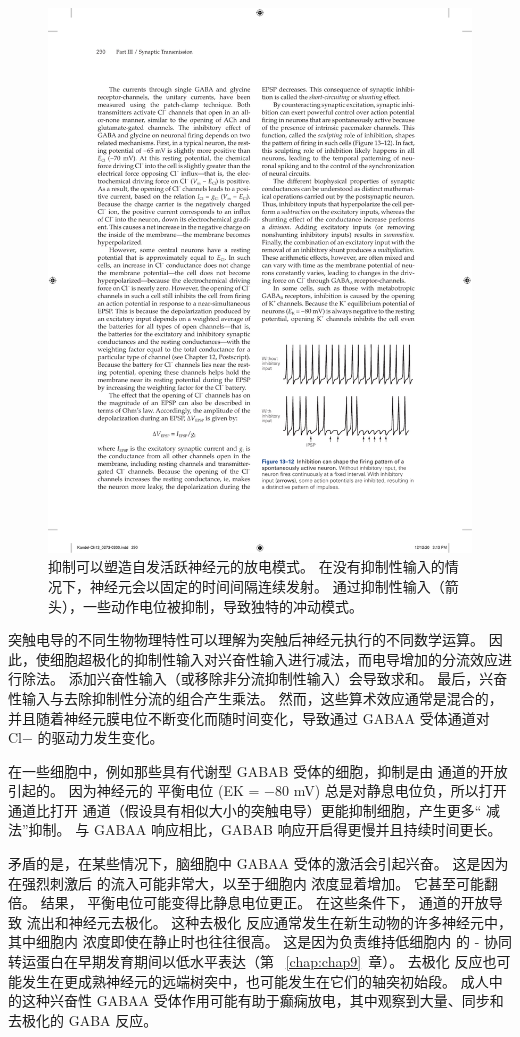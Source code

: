 \begin{figure}[htbp]
	\centering
	\includegraphics[width=0.5\linewidth]{chap13/fig_13_12}
	\caption{抑制可以塑造自发活跃神经元的放电模式。 在没有抑制性输入的情况下，神经元会以固定的时间间隔连续发射。 通过抑制性输入（箭头），一些动作电位被抑制，导致独特的冲动模式。}
	\label{fig:13_12}
\end{figure}


突触电导的不同生物物理特性可以理解为突触后神经元执行的不同数学运算。
因此，使细胞超极化的抑制性输入对兴奋性输入进行减法，而电导增加的分流效应进行除法。
添加兴奋性输入（或移除非分流抑制性输入）会导致求和。
最后，兴奋性输入与去除抑制性分流的组合产生乘法。
然而，这些算术效应通常是混合的，并且随着神经元膜电位不断变化而随时间变化，导致通过 GABAA 受体通道对 Cl− 的驱动力发生变化。


在一些细胞中，例如那些具有代谢型 GABAB 受体的细胞，抑制是由  通道的开放引起的。
因为神经元的  平衡电位 (EK = −80 mV) 总是对静息电位负，所以打开  通道比打开  通道（假设具有相似大小的突触电导）更能抑制细胞，产生更多“ 减法”抑制。
与 GABAA 响应相比，GABAB 响应开启得更慢并且持续时间更长。


矛盾的是，在某些情况下，脑细胞中 GABAA 受体的激活会引起兴奋。
这是因为在强烈刺激后  的流入可能非常大，以至于细胞内  浓度显着增加。
它甚至可能翻倍。
结果， 平衡电位可能变得比静息电位更正。
在这些条件下， 通道的开放导致  流出和神经元去极化。
这种去极化  反应通常发生在新生动物的许多神经元中，其中细胞内  浓度即使在静止时也往往很高。
这是因为负责维持低细胞内  的 - 协同转运蛋白在早期发育期间以低水平表达（第 ~\ref{chap:chap9}~章）。
去极化  反应也可能发生在更成熟神经元的远端树突中，也可能发生在它们的轴突初始段。
成人中的这种兴奋性 GABAA 受体作用可能有助于癫痫放电，其中观察到大量、同步和去极化的 GABA 反应。



